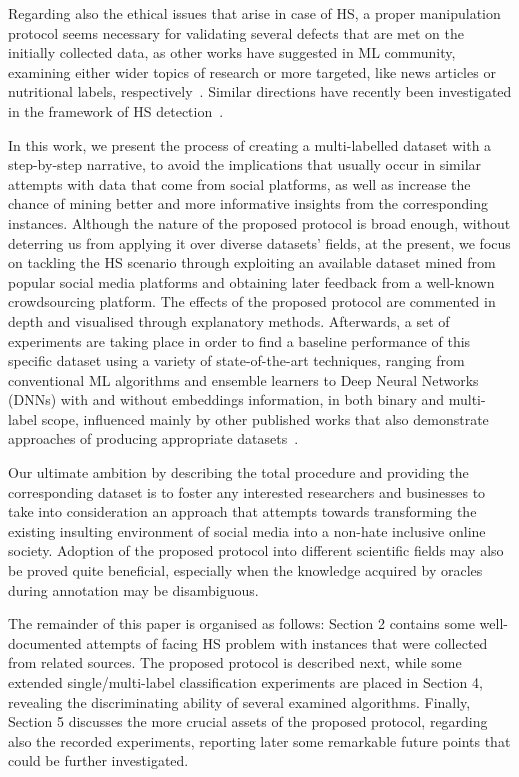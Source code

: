 \documentclass[sigconf]{acmart}
\begin{document}
Regarding also the ethical issues that arise in case of HS, a proper manipulation protocol seems necessary for validating several defects that are met on the initially collected data, as other works have suggested in ML community, examining either wider topics of research or more targeted, like news articles or nutritional labels, respectively~\cite{DBLP:conf/cikm/SunAJHS19, DBLP:conf/cikm/HoangVN18}. Similar directions have recently been investigated in the framework of HS detection~\cite{DBLP:journals/corr/abs-2004-14454}.

In this work, we present the process of creating a multi-labelled dataset with a step-by-step narrative, to avoid the implications that usually occur in similar attempts with data that come from social platforms, as well as increase the chance of mining better and more informative insights from the corresponding instances. Although the nature of the proposed protocol is broad enough, without deterring us from applying it over diverse datasets' fields, at the present, we focus on tackling the HS scenario through exploiting an available dataset mined from popular social media platforms and obtaining later feedback from a well-known crowdsourcing platform. The effects of the proposed protocol are commented in depth and visualised through explanatory methods. Afterwards, a set of experiments are taking place in order to find a baseline performance of this specific dataset using a variety of state-of-the-art techniques, ranging from conventional ML algorithms and ensemble learners to Deep Neural Networks (DNNs) with and without embeddings information, in both binary and multi-label scope, influenced mainly by other published works that also demonstrate approaches of producing appropriate datasets~\cite{hateTweets,almeida2013towards}. 

Our ultimate ambition by describing the total procedure and providing the corresponding dataset is to foster any interested researchers and businesses to take into consideration an approach that attempts towards transforming the existing insulting environment of social media into a non-hate inclusive online society. Adoption of the proposed protocol into different scientific fields may also be proved quite beneficial, especially when the knowledge acquired by oracles during annotation may be disambiguous.

The remainder of this paper is organised as follows: Section 2 contains some well-documented attempts of facing HS problem with instances that were collected from related sources. The proposed protocol is described next, while some extended single/multi-label classification experiments are placed in Section 4, revealing the discriminating ability of several examined algorithms. Finally, Section 5 discusses the more crucial assets of the proposed protocol, regarding also the recorded experiments, reporting later some remarkable future points that could be further investigated.
\end{document}
